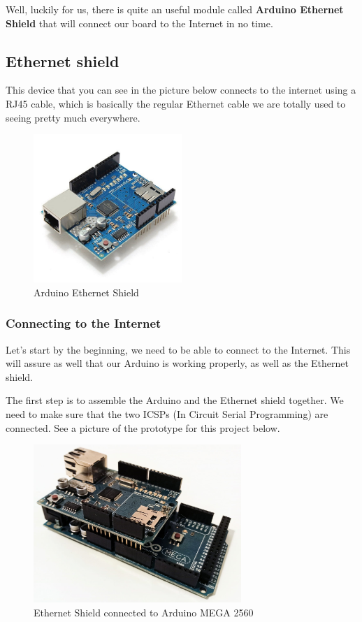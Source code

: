Well, luckily for us, there is quite an useful module called \textbf{Arduino Ethernet Shield} that will connect our board to the Internet in no time.

\subsection{Ethernet shield}
This device that you can see in the picture below connects to the internet using a RJ45 cable, which is basically the regular Ethernet cable we are totally used to seeing pretty much everywhere.

\begin{figure}[H]
    \centering
    \includegraphics[width=0.5\textwidth]{fig/ethernet.jpg}
    \caption{Arduino Ethernet Shield}
    \label{fig:ethernet}
\end{figure}

\vspace{7mm}
\subsubsection{Connecting to the Internet}
Let's start by the beginning, we need to be able to connect to the Internet. This will assure as well that our Arduino is working properly, as well as the Ethernet shield.

The first step is to assemble the Arduino and the Ethernet shield together. We need to make sure that the two ICSPs (In Circuit Serial Programming) are connected. See a picture of the prototype for this project below.

\begin{figure}[H]
    \centering
    \includegraphics[width=0.7\textwidth]{fig/ethernet-connected.jpg}
    \caption{Ethernet Shield connected to Arduino MEGA 2560}
    \label{fig:ethernet-connected}
\end{figure}

